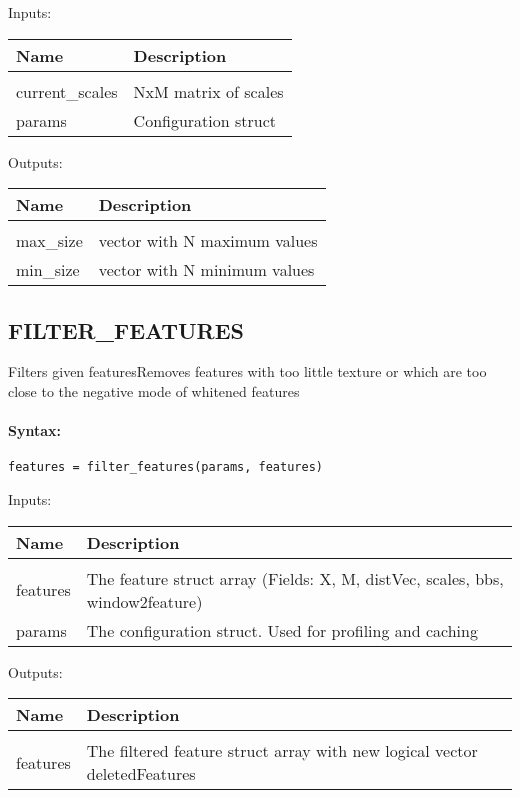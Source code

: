Inputs:

\begin{tabular}{|l|p{5cm}|}
\hline
\textbf{Name} & \textbf{Description} \\
\hline \hline \\
current\_scales & NxM matrix of scales  \\ \hline
params & Configuration struct  \\ \hline
\end{tabular}
Outputs:

\begin{tabular}{|l|p{5cm}|}
\hline
\textbf{Name} & \textbf{Description} \\
\hline \hline \\
max\_size & vector with N maximum values  \\ \hline
min\_size & vector with N minimum values  \\ \hline
\end{tabular}

\subsection{FILTER\_FEATURES}

Filters given featuresRemoves features with too little texture or which are too close to the negative mode of whitened features

\paragraph{Syntax:} \verb|features = filter_features(params, features)|

Inputs:

\begin{tabular}{|l|p{5cm}|}
\hline
\textbf{Name} & \textbf{Description} \\
\hline \hline \\
features & The feature struct array (Fields: X, M, distVec, scales, bbs, window2feature)  \\ \hline
params & The configuration struct. Used for profiling and caching  \\ \hline
\end{tabular}
Outputs:

\begin{tabular}{|l|p{5cm}|}
\hline
\textbf{Name} & \textbf{Description} \\
\hline \hline \\
features & The filtered feature struct array with new logical vector deletedFeatures  \\ \hline
\end{tabular}

